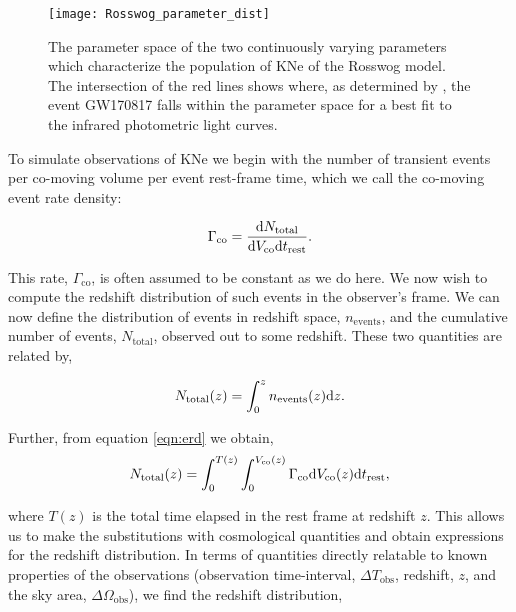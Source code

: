 \begin{figure}[h!]
  \centering
  \texttt{[image: Rosswog\_parameter\_dist]}
  \caption{The parameter space of the two continuously varying parameters which characterize the population of KNe of the Rosswog model. The intersection of the red lines shows where, as determined by \citep{Rosswog2018}, the event GW170817 falls within the parameter space for a best fit to the infrared photometric light curves.}\label{fig: ross_params}
\end{figure}

To simulate observations of KNe we begin with the number of transient events per co-moving volume per event rest-frame time, which we call the co-moving event rate density:

\begin{equation}\label{eqn:erd}
   \Gamma_{\mathrm{co}} =\frac{\mathrm{d} N_{\mathrm{total}}}{\mathrm{d} V_{\mathrm{co}}\mathrm{d} t_{\mathrm{rest}}}.
\end{equation}\par

This rate, $\Gamma_{\mathrm{co}}$, is often assumed to be constant as we do here. We now wish to compute the redshift distribution of such events in the observer's frame. We can now define the distribution of events in redshift space, $n_{\mathrm{events}}$, and the cumulative number of events, $N_{\mathrm{total}}$, observed out to some redshift. These two quantities are related by,

\begin{equation}\label{eqn:total_dist}
N_{\mathrm{total}}(z) = \int_0^{z} n_{\mathrm{events}}(z) \mathrm{d} z.
\end{equation}\par
Further, from equation \ref{eqn:erd} we obtain,
\begin{equation}
N_{\mathrm{ total}}(z) = \int_0^{T (z)} \int_0^{V_{\mathrm{co}}(z)}  \Gamma_{\mathrm{co}} \mathrm{d} V_{\mathrm{co}}(z)\mathrm{d} t_{\mathrm{rest}},
\end{equation}\par

where $T(z)$ is the total time elapsed in the rest frame at redshift $z$. This allows us to make the substitutions with cosmological quantities and obtain expressions for the redshift distribution. In terms of quantities directly relatable to known properties of the observations (observation time-interval, $\Delta T_{\mathrm{obs}}$, redshift, $z$, and the sky area, $\Delta \Omega_{\mathrm{obs}}$), we find the redshift distribution,\par

